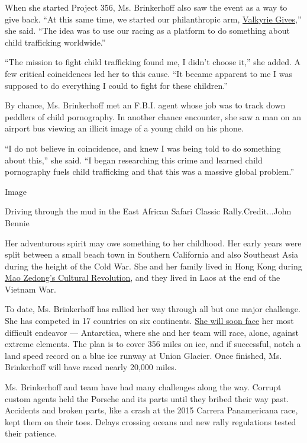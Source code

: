 When she started Project 356, Ms. Brinkerhoff also saw the event as a
way to give back. ``At this same time, we started our philanthropic arm,
\href{https://www.valkyriegives.org/}{Valkyrie Gives},'' she said. ``The
idea was to use our racing as a platform to do something about child
trafficking worldwide.''

``The mission to fight child trafficking found me, I didn't choose it,''
she added. A few critical coincidences led her to this cause. ``It
became apparent to me I was supposed to do everything I could to fight
for these children.''

By chance, Ms. Brinkerhoff met an F.B.I. agent whose job was to track
down peddlers of child pornography. In another chance encounter, she saw
a man on an airport bus viewing an illicit image of a young child on his
phone.

``I do not believe in coincidence, and knew I was being told to do
something about this,'' she said. ``I began researching this crime and
learned child pornography fuels child trafficking and that this was a
massive global problem.''

Image

Driving through the mud in the East African Safari Classic
Rally.Credit...John Bennie

Her adventurous spirit may owe something to her childhood. Her early
years were split between a small beach town in Southern California and
also Southeast Asia during the height of the Cold War. She and her
family lived in Hong Kong during
\href{https://www.nytimes3xbfgragh.onion/2016/05/15/world/asia/china-cultural-revolution-explainer.html}{Mao
Zedong's Cultural Revolution}, and they lived in Laos at the end of the
Vietnam War.

To date, Ms. Brinkerhoff has rallied her way through all but one major
challenge. She has competed in 17 countries on six continents.
\href{https://www.youtube.com/channel/UCElmKq1ePnGrPKPqH1fIqLg}{She will
soon face} her most difficult endeavor --- Antarctica, where she and her
team will race, alone, against extreme elements. The plan is to cover
356 miles on ice, and if successful, notch a land speed record on a blue
ice runway at Union Glacier. Once finished, Ms. Brinkerhoff will have
raced nearly 20,000 miles.

Ms. Brinkerhoff and team have had many challenges along the way. Corrupt
custom agents held the Porsche and its parts until they bribed their way
past. Accidents and broken parts, like a crash at the 2015 Carrera
Panamericana race, kept them on their toes. Delays crossing oceans and
new rally regulations tested their patience.

